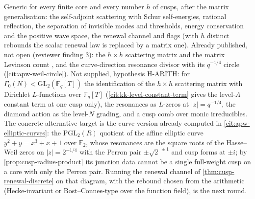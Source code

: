 \begin{observation}
\label{obs:cusp-arith-next}
Generic for every finite core and every number $h$ of cusps, after the matrix generalisation: the
self-adjoint scattering with Schur self-energies, rational reflection, the separation of invisible modes and
thresholds, energy conservation and the positive wave space, the renewal channel and flags (with $h$
distinct rebounds the scalar renewal law is replaced by a matrix one). Already published, not open (reviewer finding 3): the $h\times h$ scattering matrix and the matrix
Levinson count \cite{childs2012levinson}, and the curve-direction resonance divisor with its $q^{-1/4}$
circle (\cref{cit:apw-weil-circle}). Not supplied, hypothesis H-ARITH:
for $\Gamma_0(N)<\mathrm{GL}_2(\mathbb F_q[T])$ the identification of the $h\times h$ scattering matrix
with Dirichlet $L$-functions over $\mathbb F_q[T]$ (\cref{cit:kk-level-constant-term} gives the level-$A$
constant term at one cusp only), the resonances as $L$-zeros at $|z| = q^{-1/4}$, the diamond action as
the level-$N$ grading, and a cusp comb over monic irreducibles. The concrete alternative target is the
curve version already computed in \cref{cit:apw-elliptic-curves}: the $\mathrm{PGL}_2(R)$ quotient of the
affine elliptic curve $y^2+y = x^3+x+1$ over $\mathbb F_2$, whose resonances are the square roots of the
Hasse--Weil zeros on $|z| = 2^{-1/4}$ with the Perron pair $\pm\sqrt2^{\,\pm1}$ and cusp forms at $\pm i$;
by \cref{prop:cusp-radius-product} its junction data cannot be a single full-weight cusp on a core with
only the Perron pair. Running the renewal channel of \cref{thm:cusp-renewal-discrete} on that diagram,
with the rebound chosen from the arithmetic (Hecke-invariant or Bost--Connes-type over the function
field), is the next round.
\end{observation}
